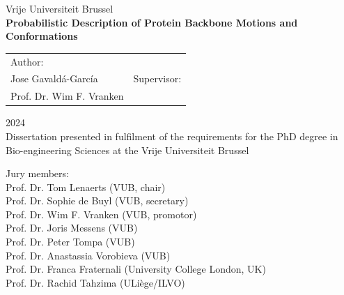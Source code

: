 \documentclass[b5paper, 12pt]{book}
\begin{document}
%  

\frontmatter

\begin{titlepage}
    \centering

    {\LARGE Vrije Universiteit Brussel}\\
    \vspace{1cm}
    \textbf{\LARGE Probabilistic Description of Protein Backbone Motions and Conformations}

    \vspace{1cm}

    \begin{tabular}{p{} p{}}
        \centering Author:\\Jose Gavaldá-García &
        \centering Supervisor:\\Prof. Dr. Wim F. Vranken \\
    \end{tabular}



    \large{2024}\\[1cm]
    \normalsize{Dissertation presented in fulfilment of the requirements for the PhD degree in Bio-engineering Sciences at the Vrije Universiteit Brussel}

    \vspace{1cm}

    \normalsize{Jury members:\\
Prof. Dr. Tom Lenaerts (VUB, chair)\\
Prof. Dr. Sophie de Buyl (VUB, secretary)\\
Prof. Dr. Wim F. Vranken (VUB, promotor)\\
Prof. Dr. Joris Messens (VUB)\\
Prof. Dr. Peter Tompa (VUB)\\
Prof. Dr. Anastassia Vorobieva (VUB)\\
Prof. Dr. Franca Fraternali (University College London, UK)\\
Prof. Dr. Rachid Tahzima (ULiège/ILVO)}

    \vfill %


\end{titlepage}
\end{document}

